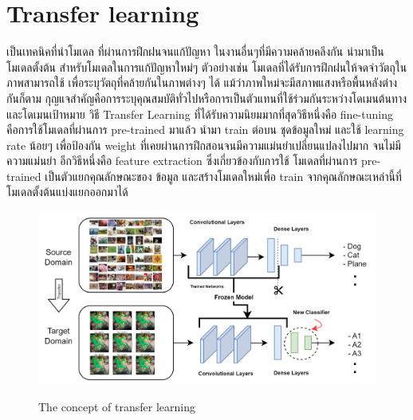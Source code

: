 \newpage

\section{Transfer learning}




เป็นเทคนิคที่นำโมเดล ที่ผ่านการฝึกฝนจนแก้ปัญหา ในงานอื่นๆที่มีความคล้ายคลึงกัน
นำมาเป็นโมเดลตั้งต้น สำหรับโมเดลในการแก้ปัญหาใหม่ๆ
ตัวอย่างเช่น โมเดลที่ได้รับการฝึกฝนให้จดจำวัตถุในภาพสามารถใช้
เพื่อระบุวัตถุที่คล้ายกันในภาพต่างๆ ได้
แม้ว่าภาพใหม่จะมีสภาพแสงหรือพื้นหลังต่างกันก็ตาม
กุญแจสำคัญคือการระบุคุณสมบัติทั่วไปหรือการเป็นตัวแทนที่ใช้ร่วมกันระหว่างโดเมนต้นทางและโดเมนเป้าหมาย
วิธี Transfer Learning ที่ได้รับความนิยมมากที่สุดวิธีหนึ่งคือ fine-tuning
คือการใช้โมเดลที่ผ่านการ  pre-trained  มาแล้ว นำมา train ต่อบน ชุดข้อมูลใหม่
และใช้ learning rate น้อยๆ เพื่อป้องกัน weight ที่เคยผ่านการฝึกสอนจนมีความแม่นยำเปลี่ยนแปลงไปมาก จนไม่มีความแม่นยำ
อีกวิธีหนึ่งคือ feature extraction ซึ่งเกี่ยวข้องกับการใช้ โมเดลที่ผ่านการ  pre-trained  เป็นตัวแยกคุณลักษณะของ ข้อมูล และสร้างโมเดลใหม่เพื่อ train จากคุณลักษณะเหล่านี้ที่โมเดลตั้งต้นแบ่งแยกออกมาได้

\begin{figure}[h]
  \begin{center}

    \includegraphics[scale=0.25]{pic/model/The-architecture-transfer-learning_1.png}\cite{Transfer}
  \end{center}

  \caption[The concept of transfer learning]{The concept of transfer learning}
  \label{fig:The concept of transfer learning}
\end{figure}

